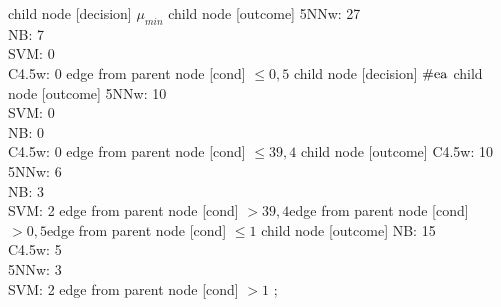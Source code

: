 child {node [decision] {${\mu}_{min}$}
child {node [outcome] {
5NNw: 27\\
NB: 7\\
SVM: 0\\
C4.5w: 0} edge from parent node [cond] {$\leq0,5$}}
child {node [decision] {$\operatorname*{\#ea}$}
child {node [outcome] {
5NNw: 10\\
SVM: 0\\
NB: 0\\
C4.5w: 0} edge from parent node [cond] {$\leq39,4$}}
child {node [outcome] {
C4.5w: 10\\
5NNw: 6\\
NB: 3\\
SVM: 2} edge from parent node [cond] {$>39,4$}}edge from parent node [cond] {$>0,5$}}edge from parent node [cond] {$\leq1$}}
child {node [outcome] {
NB: 15\\
C4.5w: 5\\
5NNw: 3\\
SVM: 2} edge from parent node [cond] {$>1$}}
;